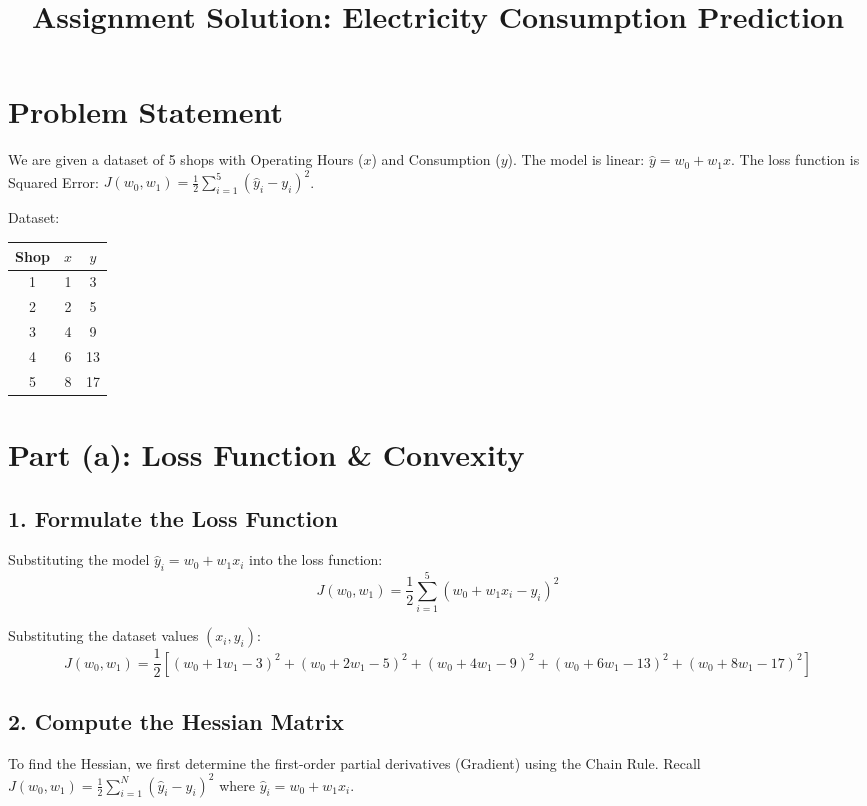 \documentclass{article}
\title{Assignment Solution: Electricity Consumption Prediction}
\author{}
\date{}
\begin{document}
\maketitle

\section*{Problem Statement}
We are given a dataset of 5 shops with Operating Hours ($x$) and Consumption ($y$).
The model is linear: $\hat{y} = w_0 + w_1 x$.
The loss function is Squared Error: $J(w_0, w_1) = \frac{1}{2}\sum_{i=1}^{5}(\hat{y}_i - y_i)^2$.

Dataset:
\begin{center}
\begin{tabular}{c c c}
\toprule
Shop & $x$ & $y$ \\
\midrule
1 & 1 & 3 \\
2 & 2 & 5 \\
3 & 4 & 9 \\
4 & 6 & 13 \\
5 & 8 & 17 \\
\bottomrule
\end{tabular}
\end{center}

\section*{Part (a): Loss Function \& Convexity}

\subsection*{1. Formulate the Loss Function}
Substituting the model $\hat{y}_i = w_0 + w_1 x_i$ into the loss function:
$$ J(w_0, w_1) = \frac{1}{2} \sum_{i=1}^{5} (w_0 + w_1 x_i - y_i)^2 $$

Substituting the dataset values $(x_i, y_i)$:
$$
J(w_0, w_1) = \frac{1}{2} \left[
(w_0 + 1w_1 - 3)^2 +
(w_0 + 2w_1 - 5)^2 +
(w_0 + 4w_1 - 9)^2 +
(w_0 + 6w_1 - 13)^2 +
(w_0 + 8w_1 - 17)^2
\right]
$$

\subsection*{2. Compute the Hessian Matrix}
To find the Hessian, we first determine the first-order partial derivatives (Gradient) using the Chain Rule.
Recall $J(w_0, w_1) = \frac{1}{2}\sum_{i=1}^{N}(\hat{y}_i - y_i)^2$ where $\hat{y}_i = w_0 + w_1 x_i$.
\end{document}
